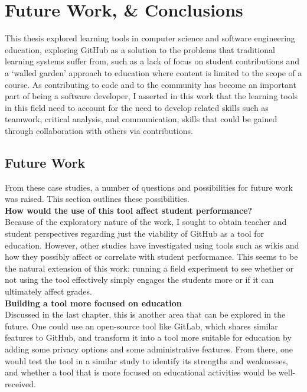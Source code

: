 \chapter{Future Work, \& Conclusions}

This thesis explored learning tools in computer science and software engineering education, exploring GitHub as a solution to the problems that traditional learning systems suffer from, such as a lack of focus on student contributions and a `walled garden' approach to education where content is limited to the scope of a course. As contributing to code and to the community has become an important part of being a software developer, I asserted in this work that the learning tools in this field need to account for the need to develop related skills such as teamwork, critical analysis, and communication, skills that could be gained through collaboration with others via contributions.

\section{Future Work}
From these case studies, a number of questions and possibilities for future work was raised. This section outlines these possibilities. \\

\textbf{How would the use of this tool affect student performance?} \\
Because of the exploratory nature of the work, I sought to obtain teacher and student perspectives regarding just the viability of GitHub as a tool for education. However, other studies have investigated using tools such as wikis \cite{minocha2007collaborative} and how they possibly affect or correlate with student performance. This seems to be the natural extension of this work: running a field experiment to see whether or not using the tool effectively simply engages the students more or if it can ultimately affect grades. \\

\textbf{Building a tool more focused on education} \\
Discussed in the last chapter, this is another area that can be explored in the future. One could use an open-source tool like GitLab, which shares similar features to GitHub, and transform it into a tool more suitable for education by adding some privacy options and some administrative features. From there, one would test the tool in a similar study to identify its strengths and weaknesses, and whether a tool that is more focused on educational activities would be well-received. \\

